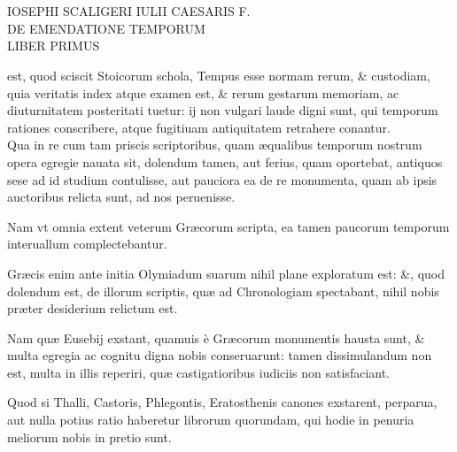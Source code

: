 

\chapter{}
\begin{center}
{\scshape
IOSEPHI SCALIGERI IULII CAESARIS F.\\
DE EMENDATIONE TEMPORUM\\
LIBER PRIMUS\\
}%
\end{center}
\normalsize

 est, quod sciscit Stoicorum
schola, Tempus esse normam rerum, \&
custodiam, quia veritatis index atque examen
est, \& rerum gestarum memoriam, ac
diuturnitatem posteritati tuetur: ij non vulgari
laude digni sunt, qui temporum rationes
conscribere, atque fugitiuam antiquitatem
retrahere conantur.
\\ \p
Qua in re cum
tam priscis scriptoribus, quam æqualibus
temporum nostrum opera egregie nauata sit, dolendum tamen, aut
ferius, quam oportebat, antiquos sese ad id studium contulisse, aut pauciora
ea de re monumenta, quam ab ipsis auctoribus relicta sunt, ad
nos peruenisse.

Nam vt omnia extent veterum Græcorum scripta, ea
tamen paucorum temporum interuallum complectebantur.

Græcis
enim ante initia Olymiadum suarum nihil plane exploratum est: \&,
quod dolendum est, de illorum scriptis, quæ ad Chronologiam spectabant,
nihil nobis præter desiderium relictum est.

Nam quæ Eusebij exstant,
quamuis è Græcorum monumentis hausta sunt, \& multa egregia
ac cognitu digna nobis conseruarunt: tamen dissimulandum non est,
multa in illis reperiri, quæ castigatioribus iudiciis non satisfaciant.

 Quod si Thalli, Castoris, Phlegontis,
 Eratosthenis canones exstarent,
perparua, aut nulla potius ratio haberetur librorum quorundam, qui
hodie in penuria meliorum nobis in pretio sunt.

